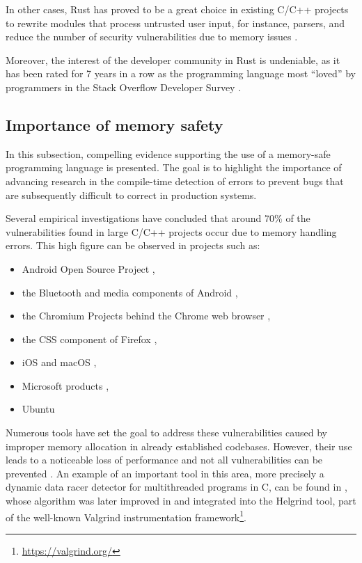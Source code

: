 In other cases, Rust has proved to be a great choice in existing C/C++ projects to rewrite modules
that process untrusted user input, for instance, parsers,
and reduce the number of security vulnerabilities due to memory issues \cite{chifflier2017writing}.

Moreover, the interest of the developer community in Rust is undeniable,
as it has been rated for 7 years in a row as the programming language most ``loved'' by programmers
in the Stack Overflow Developer Survey \cite{so-survey2022}.

\subsection{Importance of memory safety}

In this subsection, compelling evidence supporting
the use of a memory-safe programming language is presented.
The goal is to highlight the importance of advancing research in the compile-time detection of errors
to prevent bugs that are subsequently difficult to correct in production systems.

Several empirical investigations have concluded that around 70\% of the vulnerabilities
found in large C/C++ projects occur due to memory handling errors.
This high figure can be observed in projects such as:

\begin{itemize}
      \item Android Open Source Project \cite{memory-bugs-android},
      \item the Bluetooth and media components of Android \cite{memory-bugs-android-media-bluetooth},
      \item the Chromium Projects behind the Chrome web browser \cite{memory-bugs-chrome},
      \item the CSS component of Firefox \cite{memory-bugs-firefox},
      \item iOS and macOS \cite{memory-bugs-ios-macos},
      \item Microsoft products \cite{miller-security-microsoft2019, memory-bugs-microsoft},
      \item Ubuntu \cite{memory-bugs-ubuntu}
\end{itemize}

Numerous tools have set the goal to address these vulnerabilities
caused by improper memory allocation in already established codebases.
However, their use leads to a noticeable loss of performance and
not all vulnerabilities can be prevented \cite{szekeres2013sok}.
An example of an important tool in this area, more precisely
a dynamic data racer detector for multithreaded programs in C,
can be found in \cite{savage1997eraser},
whose algorithm was later improved in \cite{jannesari2009helgrind+} and
integrated into the Helgrind tool, part of the well-known
Valgrind instrumentation framework\footnote{\url{https://valgrind.org/}}.

